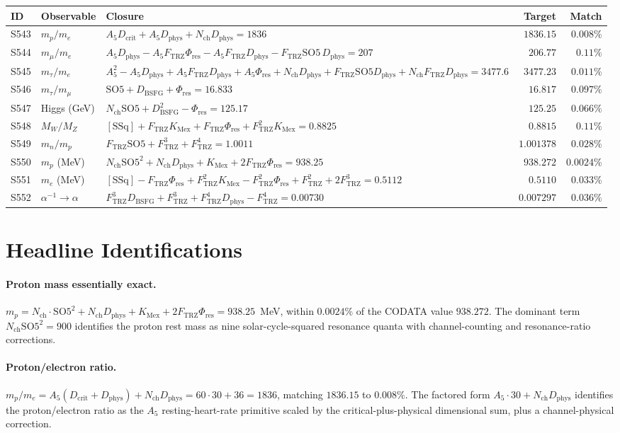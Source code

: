 \documentclass[11pt]{article}
\newcommand{\Ftrz}{F_{\mathrm{TRZ}}}
\newcommand{\Phires}{\Phi_{\mathrm{res}}}
\newcommand{\KMex}{K_{\mathrm{Mex}}}
\newcommand{\Dphys}{D_{\mathrm{phys}}}
\newcommand{\Dbsfg}{D_{\mathrm{BSFG}}}
\newcommand{\Dcrit}{D_{\mathrm{crit}}}
\newcommand{\Nch}{N_{\mathrm{ch}}}
\newcommand{\SOfive}{\mathrm{SO5}}
\newcommand{\Afive}{A_{5}}
\newcommand{\SSq}{[\mathrm{SSq}]}
\begin{document}
\begin{longtable}{@{}lllrr@{}}
\toprule
ID & Observable & Closure & Target & Match \\
\midrule
\endhead
S543 & $m_p/m_e$ & $\Afive\Dcrit+\Afive\Dphys+\Nch\Dphys=1836$ & $1836.15$ & $0.008\%$ \\
S544 & $m_\mu/m_e$ & $\Afive\Dphys-\Afive\Ftrz\Phires-\Afive\Ftrz\Dphys-\Ftrz\SOfive\,\Dphys=207$ & $206.77$ & $0.11\%$ \\
S545 & $m_\tau/m_e$ & $\Afive^{2}-\Afive\Dphys+\Afive\Ftrz\Dphys+\Afive\Phires+\Nch\Dphys+\Ftrz\SOfive\Dphys+\Nch\Ftrz\Dphys=3477.6$ & $3477.23$ & $0.011\%$ \\
S546 & $m_\tau/m_\mu$ & $\SOfive+\Dbsfg+\Phires=16.833$ & $16.817$ & $0.097\%$ \\
S547 & Higgs (GeV) & $\Nch\SOfive+\Dbsfg^{2}-\Phires=125.17$ & $125.25$ & $0.066\%$ \\
S548 & $M_W/M_Z$ & $\SSq+\Ftrz\KMex+\Ftrz\Phires+\Ftrz^{2}\KMex=0.8825$ & $0.8815$ & $0.11\%$ \\
S549 & $m_n/m_p$ & $\Ftrz\SOfive+\Ftrz^{3}+\Ftrz^{4}=1.0011$ & $1.001378$ & $0.028\%$ \\
S550 & $m_p$ (MeV) & $\Nch\SOfive^{2}+\Nch\Dphys+\KMex+2\Ftrz\Phires=938.25$ & $938.272$ & $\mathbf{0.0024\%}$ \\
S551 & $m_e$ (MeV) & $\SSq-\Ftrz\Phires+\Ftrz^{2}\KMex-\Ftrz^{2}\Phires+\Ftrz^{2}+2\Ftrz^{3}=0.5112$ & $0.5110$ & $0.033\%$ \\
S552 & $\alpha^{-1}\to\alpha$ & $\Ftrz^{3}\Dbsfg+\Ftrz^{3}+\Ftrz^{4}\Dphys-\Ftrz^{4}=0.00730$ & $0.007297$ & $0.036\%$ \\
\bottomrule
\end{longtable}

\section{Headline Identifications}

\paragraph{Proton mass essentially exact.}
$m_p = \Nch\cdot\SOfive^{2}+\Nch\Dphys+\KMex+2\Ftrz\Phires = 938.25$~MeV,
within $0.0024\%$ of the CODATA value $938.272$. The dominant term
$\Nch\SOfive^{2}=900$ identifies the proton rest mass as nine
solar-cycle-squared resonance quanta with channel-counting and resonance-ratio
corrections.

\paragraph{Proton/electron ratio.}
$m_p/m_e = \Afive(\Dcrit+\Dphys)+\Nch\Dphys = 60\cdot 30 + 36 = 1836$,
matching $1836.15$ to $0.008\%$. The factored form
$\Afive\cdot 30+\Nch\Dphys$ identifies the proton/electron ratio as the
$\Afive$ resting-heart-rate primitive scaled by the critical-plus-physical
dimensional sum, plus a channel-physical correction.
\end{document}
